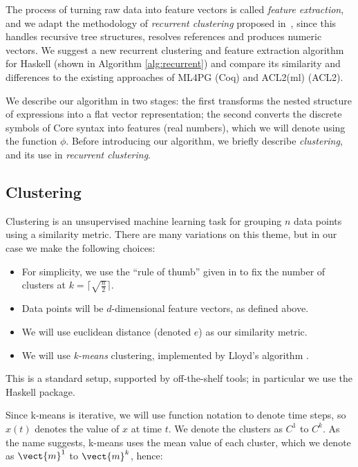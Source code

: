 The process of turning raw data into feature vectors is called \emph{feature
  extraction}, and we adapt the methodology of \emph{recurrent clustering}
proposed in~\cite{DBLP:journals/corr/HerasK14,heras2013proof}, since this
handles recursive tree structures, resolves references and produces numeric
vectors. We suggest a new recurrent clustering and feature extraction algorithm
for Haskell (shown in Algorithm \ref{alg:recurrent}) and compare its similarity
and differences to the existing approaches of ML4PG (Coq) and ACL2(ml) (ACL2).

We describe our algorithm in two stages: the first transforms the nested
structure of expressions into a flat vector representation; the second converts
the discrete symbols of Core syntax into features (real numbers), which we will
denote using the function $\phi$. Before introducing our algorithm, we briefly
describe \emph{clustering}, and its use in \emph{recurrent clustering}.

\subsection{Clustering}

Clustering is an unsupervised machine learning task for grouping $n$ data points
using a similarity metric. There are many variations on this theme, but in our
case we make the following choices:

\begin{itemize}
\item For simplicity, we use the ``rule of thumb'' given in
  \cite[pp. 365]{mardia1979multivariate} to fix the number of clusters at
  $k = \lceil \sqrt{\frac{n}{2}} \rceil$.
\item Data points will be $d$-dimensional feature vectors, as defined above.
\item We will use euclidean distance (denoted $e$) as our similarity metric.
\item We will use \emph{k-means} clustering, implemented by Lloyd's algorithm
  \cite{lloyd1982least}.
\end{itemize}

This is a standard setup, supported by off-the-shelf tools; in particular we use
the  Haskell package.

Since k-means is iterative, we will use function notation to denote time steps,
so $x(t)$ denotes the value of $x$ at time $t$. We denote the clusters as $C^1$
to $C^k$. As the name suggests, k-means uses the mean value of each cluster,
which we denote as $\vect{m}^1$ to $\vect{m}^k$, hence:

